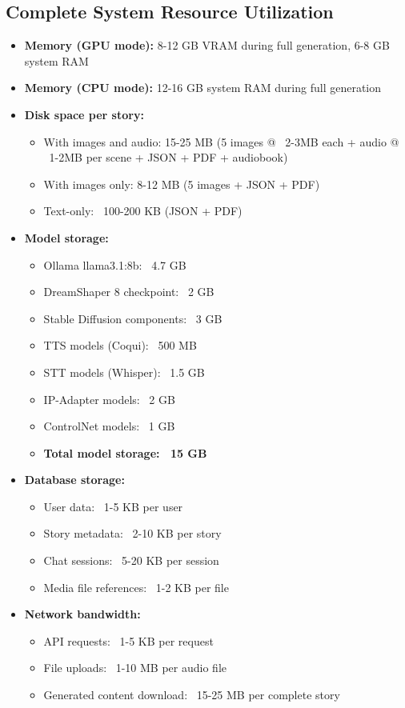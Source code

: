 {\subsection{Complete System Resource Utilization}
\begin{itemize}
    \item \textbf{Memory (GPU mode):} 8-12 GB VRAM during full generation, 6-8 GB system RAM
    \item \textbf{Memory (CPU mode):} 12-16 GB system RAM during full generation
    \item \textbf{Disk space per story:} 
    \begin{itemize}
        \item With images and audio: 15-25 MB (5 images @ ~2-3MB each + audio @ ~1-2MB per scene + JSON + PDF + audiobook)
        \item With images only: 8-12 MB (5 images + JSON + PDF)
        \item Text-only: ~100-200 KB (JSON + PDF)
    \end{itemize}
    \item \textbf{Model storage:} 
    \begin{itemize}
        \item Ollama llama3.1:8b: ~4.7 GB
        \item DreamShaper 8 checkpoint: ~2 GB
        \item Stable Diffusion components: ~3 GB
        \item TTS models (Coqui): ~500 MB
        \item STT models (Whisper): ~1.5 GB
        \item IP-Adapter models: ~2 GB
        \item ControlNet models: ~1 GB
        \item \textbf{Total model storage: ~15 GB}
    \end{itemize}
    \item \textbf{Database storage:} 
    \begin{itemize}
        \item User data: ~1-5 KB per user
        \item Story metadata: ~2-10 KB per story
        \item Chat sessions: ~5-20 KB per session
        \item Media file references: ~1-2 KB per file
    \end{itemize}
    \item \textbf{Network bandwidth:} 
    \begin{itemize}
        \item API requests: ~1-5 KB per request
        \item File uploads: ~1-10 MB per audio file
        \item Generated content download: ~15-25 MB per complete story
    \end{itemize}
\end{itemize}

}
